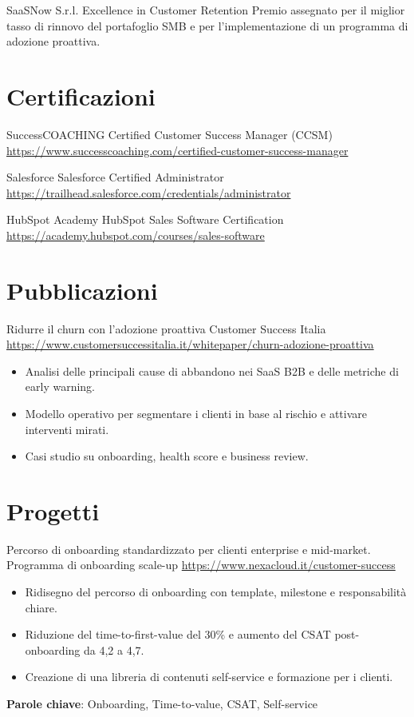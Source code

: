 \documentclass[a4paper, serif, 10pt]{moderncv}
\begin{document}
        {SaaSNow S.r.l.}
        {Excellence in Customer Retention}
        {}
        {}
        {Premio assegnato per il miglior tasso di rinnovo del portafoglio SMB e per l'implementazione di un programma di adozione proattiva.}
\section{Certificazioni}

        {SuccessCOACHING}
        {Certified Customer Success Manager (CCSM)}
        {\url{https://www.successcoaching.com/certified-customer-success-manager}}
        {}
        {}

        {Salesforce}
        {Salesforce Certified Administrator}
        {\url{https://trailhead.salesforce.com/credentials/administrator}}
        {}
        {}

        {HubSpot Academy}
        {HubSpot Sales Software Certification}
        {\url{https://academy.hubspot.com/courses/sales-software}}
        {}
        {}
\section{Pubblicazioni}

        {Ridurre il churn con l'adozione proattiva}
        {Customer Success Italia}
        {\url{https://www.customersuccessitalia.it/whitepaper/churn-adozione-proattiva}}
        {}
        {\begin{itemize}
\item Analisi delle principali cause di abbandono nei SaaS B2B e delle metriche di early warning.
\item Modello operativo per segmentare i clienti in base al rischio e attivare interventi mirati.
\item Casi studio su onboarding, health score e business review.
\end{itemize}}
\section{Progetti}

        {Percorso di onboarding standardizzato per clienti enterprise e mid-market.}
        {Programma di onboarding scale-up}
        {\url{https://www.nexacloud.it/customer-success}}
        {}
        {\begin{itemize}
\item Ridisegno del percorso di onboarding con template, milestone e responsabilità chiare.
\item Riduzione del time-to-first-value del 30\% e aumento del CSAT post-onboarding da 4,2 a 4,7.
\item Creazione di una libreria di contenuti self-service e formazione per i clienti.
\end{itemize}
\textbf{Parole chiave}: Onboarding, Time-to-value, CSAT, Self-service}
\end{document}
